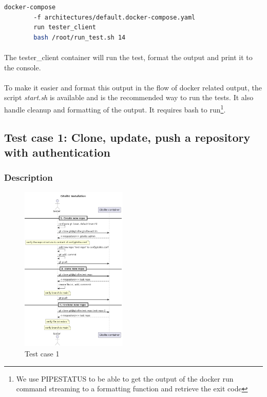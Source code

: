 \begin{lstlisting}[language=bash]
    docker-compose 
        -f architectures/default.docker-compose.yaml 
        run tester_client 
        bash /root/run_test.sh 14
\end{lstlisting}

\paragraph{}
The tester\_client container will run the test, format the output and print it to the console.

\paragraph{}
To make it easier and format this output in the flow of docker related output, the script \textit{start.sh} is available and is the recommended way to run the tests. It also handle cleanup and formatting of the output. It requires bash to run\footnote{We use PIPESTATUS to be able to get the output of the docker run command streaming to a formatting function and retrieve the exit code}.



\subsection{Test case 1: Clone, update, push a repository with authentication}
\subsubsection{Description}
\begin{figure}
    \begin{center}
        \includegraphics[width=0.45\textwidth]{iteration_03/diagrams/gitolite_installation_verification}
    \end{center}
    \caption{Test case 1}
\end{figure}


